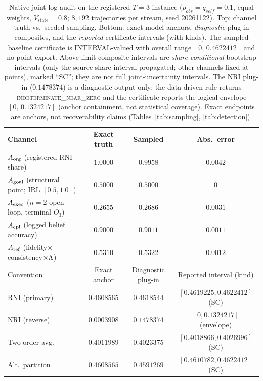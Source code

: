 \begin{table}[htbp]
\centering\small
\caption{Native joint-log audit on the registered $T=3$ instance
($p_{obs}=q_{self}=0.1$, equal weights, $V_{\mathrm{state}}=0.8$; $8{,}192$
trajectories per stream, seed 20261122). Top: channel truth vs.\ seeded
sampling. Bottom: exact model anchors, \emph{diagnostic} plug-in composites,
and the \emph{reported} certificate intervals (with kinds). The sampled
baseline certificate is INTERVAL-valued with overall range $[0,\,0.4622412]$
and no point export. Above-limit composite intervals are \emph{share-conditional}
bootstrap intervals (only the source-share interval propagated; other channels
fixed at points), marked ``SC''; they are not full joint-uncertainty
intervals. The NRI plug-in ($0.1478374$) is a diagnostic output only: the
data-driven rule returns \textsc{indeterminate\_near\_zero} and the certificate
reports the logical envelope $[0,\,0.1324217]$ (anchor containment, not
statistical coverage). Exact endpoints are anchors, not recoverability claims
(Tables~\ref{tab:sampling}, \ref{tab:detection}).}
\label{tab:native}
\begin{tabular}{@{}lccc@{}}
\toprule
Channel & Exact truth & Sampled & Abs.\ error \\
\midrule
$A_{\mathrm{org}}$ (registered RNI share) & $1.0000$ & $0.9958$ & $0.0042$ \\
$A_{\mathrm{goal}}$ (structural point; IRL $[0.5,1.0]$) & $0.5000$ & $0.5000$ & $0$ \\
$A_{\mathrm{exec}}$ ($n=2$ open-loop, terminal $O_3$) & $0.2655$ & $0.2686$ & $0.0031$ \\
$A_{\mathrm{epi}}$ (logged belief accuracy) & $0.9000$ & $0.9011$ & $0.0011$ \\
$A_{\mathrm{ref}}$ (fidelity$\times$consistency$\times\Lambda$) & $0.5310$ & $0.5322$ & $0.0012$ \\
\midrule
Convention & Exact anchor & Diagnostic plug-in & Reported interval (kind) \\
\midrule
RNI (primary) & $0.4608565$ & $0.4618544$ & $[0.4619225,0.4622412]$ (SC) \\
NRI (reverse) & $0.0003908$ & $0.1478374$ & $[0,0.1324217]$ (envelope) \\
Two-order avg. & $0.4011989$ & $0.4023375$ & $[0.4018866,0.4026996]$ (SC) \\
Alt.\ partition & $0.4608565$ & $0.4591269$ & $[0.4610782,0.4622412]$ (SC) \\
\bottomrule
\end{tabular}
\end{table}

